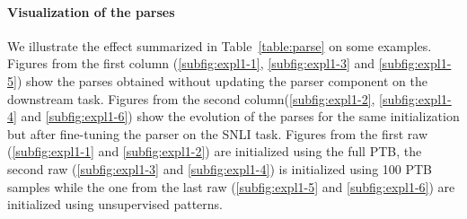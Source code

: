 \paragraph{Visualization of the parses} We illustrate the effect summarized in Table~\ref{table:parse} on some  examples. Figures from the first column (\ref{subfig:expl1-1}, \ref{subfig:expl1-3} and \ref{subfig:expl1-5}) show the parses obtained without updating the parser component on the downstream task. Figures from the second column(\ref{subfig:expl1-2}, \ref{subfig:expl1-4} and \ref{subfig:expl1-6}) show the evolution of the parses for the same initialization but after fine-tuning the parser on the SNLI task. Figures from the first raw (\ref{subfig:expl1-1} and \ref{subfig:expl1-2}) are initialized using the full PTB, the second raw (\ref{subfig:expl1-3} and \ref{subfig:expl1-4}) is initialized using 100 PTB samples while the one from the last raw (\ref{subfig:expl1-5} and \ref{subfig:expl1-6}) are initialized using unsupervised patterns.

